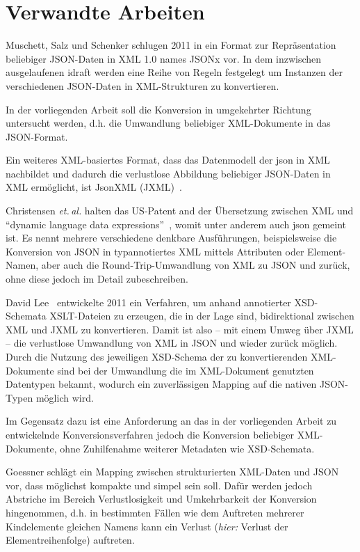 \section{Verwandte Arbeiten}

Muschett, Salz und Schenker schlugen 2011 in ein Format zur Repräsentation beliebiger JSON-Daten in XML 1.0 names JSONx vor. In dem inzwischen ausgelaufenen \gls{idraft} werden eine Reihe von Regeln festgelegt um Instanzen der verschiedenen JSON-Daten in XML-Strukturen zu konvertieren.~\cite{jsonx}

In der vorliegenden Arbeit soll die Konversion in umgekehrter Richtung untersucht werden, d.h. die Umwandlung beliebiger XML-Dokumente in das JSON-Format.

Ein weiteres XML-basiertes Format, dass das Datenmodell der \acrfull{json} in XML nachbildet und dadurch die verlustlose Abbildung beliebiger JSON-Daten in XML ermöglicht, ist JsonXML (JXML)~\cite{jxml}.

Christensen \emph{et.\,al.} halten das US-Patent and der Übersetzung zwischen XML und \enquote{dynamic language data expressions}~\cite{US7761484}, womit unter anderem auch \acrshort{json} gemeint ist. Es nennt mehrere verschiedene denkbare Ausführungen, beispielsweise die Konversion von JSON in typannotiertes XML mittels Attributen oder Element-Namen, aber auch die Round-Trip-Umwandlung von XML zu JSON und zurück, ohne diese jedoch im Detail zubeschreiben.

David Lee~\cite{lee2011jxon} entwickelte 2011 ein Verfahren, um anhand annotierter XSD-Schemata XSLT-Dateien zu erzeugen, die in der Lage sind, bidirektional zwischen XML und JXML zu konvertieren.  Damit ist also -- mit einem Umweg über JXML -- die verlustlose Umwandlung von XML in JSON und wieder zurück möglich.
Durch die Nutzung des jeweiligen XSD-Schema der zu konvertierenden XML-Dokumente sind bei der Umwandlung die im XML-Dokument genutzten Datentypen bekannt, wodurch ein zuverlässigen Mapping auf die nativen JSON-Typen möglich wird.

Im Gegensatz dazu ist eine Anforderung an das in der vorliegenden Arbeit zu entwickelnde Konversionsverfahren jedoch die Konversion beliebiger XML-Dokumente, ohne Zuhilfenahme weiterer Metadaten wie XSD-Schemata.

Goessner schlägt ein Mapping zwischen strukturierten XML-Daten und JSON vor, dass möglichst kompakte und simpel sein soll. Dafür werden jedoch Abstriche im Bereich Verlustlosigkeit und Umkehrbarkeit der Konversion hingenommen, d.h. in bestimmten Fällen wie dem Auftreten mehrerer Kindelemente gleichen Namens kann ein Verlust (\emph{hier:} Verlust der Elementreihenfolge) auftreten.~\cite{goessner2006converting}

